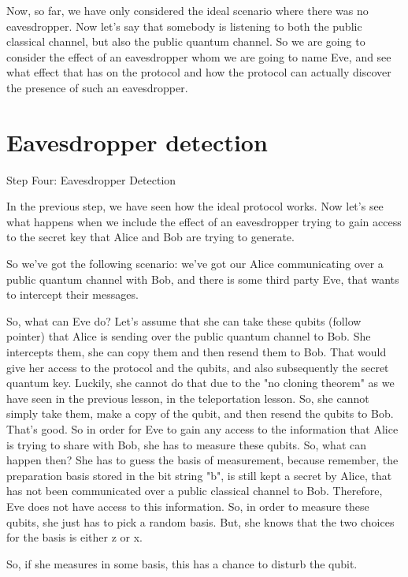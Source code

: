 Now, so far, we have only considered the ideal scenario where there was no eavesdropper. Now let's say that somebody is listening to both the public classical channel, but also the public quantum channel. So we are going to consider the effect of an eavesdropper whom we are going to name Eve, and see what effect that has on the protocol and how the protocol can actually discover the presence of such an eavesdropper.



\section{Eavesdropper detection}

Step Four: Eavesdropper Detection

In the previous step, we have seen how the ideal protocol works. Now let's see what happens when we include the effect of an eavesdropper trying to gain access to the secret key that Alice and Bob are trying to generate.

So we've got the following scenario: we've got our Alice communicating over a public quantum channel with Bob, and there is some third party Eve, that wants to intercept their messages.

So, what can Eve do? Let's assume that she can take these qubits (follow pointer) that Alice is sending over the public quantum channel to Bob. She intercepts them, she can copy them and then resend them to Bob. That would give her access to the protocol and the qubits, and also subsequently the secret quantum key. Luckily, she cannot do that due to the "no cloning theorem" as we have seen in the previous lesson, in the teleportation lesson. So, she cannot simply take them, make a copy of the qubit, and then resend the qubits to Bob. That's good. So in order for Eve to gain any access to the information that Alice is trying to share with Bob, she has to measure these qubits. So, what can happen then? She has to guess the basis of measurement, because remember, the preparation basis stored in the bit string "b", is still kept a secret by Alice, that has not been communicated over a public classical channel to Bob. Therefore, Eve does not have access to this information. So, in order to measure these qubits, she just has to pick a random basis. But, she knows that the two choices for the basis is either z or x.

So, if she measures in some basis, this has a chance to disturb the qubit.

